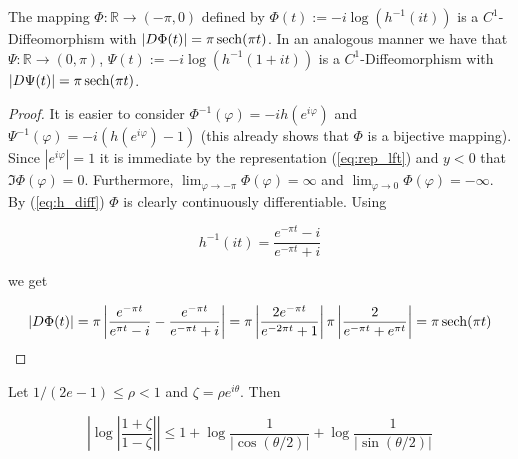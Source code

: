 \begin{lemma}
	The mapping $\Phi: \mathbb{R} \rightarrow (-\pi,0)$ defined by $\Phi(t) := -i\log\left( h^{-1}(it) \right)$ is a $C^1$-Diffeomorphism with $\vert D\Phi(t)\vert = \pi \operatorname{sech}(\pi t)$. In an analogous manner we have that $\Psi: \mathbb{R} \rightarrow (0,\pi)$, $\Psi(t) := -i\log\left( h^{-1}(1 + it) \right)$ is a $C^1$-Diffeomorphism with $\vert D\Psi(t)\vert = \pi \operatorname{sech}(\pi t)$.
	\label{lem:change_of_variables}
\end{lemma}

\begin{proof}
	It is easier to consider $\Phi^{-1}(\varphi) = -i h(e^{i\varphi})$ and $\Psi^{-1}(\varphi) = -i\left( h(e^{i\varphi}) - 1 \right)$ (this already shows that $\Phi$ is a bijective mapping). Since $\left| e^{i\varphi}\right| = 1$ it is immediate by the representation (\ref{eq:rep_lft}) and $y < 0$ that $\Im \Phi(\varphi) = 0$. Furthermore, $\lim_{\varphi \rightarrow -\pi} \Phi(\varphi) = \infty$ and $\lim_{\varphi \rightarrow 0} \Phi(\varphi) = -\infty$. By (\ref{eq:h_diff}) $\Phi$ is clearly continuously differentiable. Using
	
	\begin{equation*}
		h^{-1}(it) = \frac{e^{-\pi t} - i}{e^{-\pi t} + i}
	\end{equation*}
	
	we get

	\begin{gather*}
		\left| D\Phi(t)\right| = \pi\left| \frac{e^{-\pi t}}{e^{\pi t} - i} - \frac{e^{-\pi t}}{e^{-\pi t} + i}\right| = \pi\left| \frac{2e^{-\pi t}}{e^{-2\pi t} + 1}\right| \pi \left| \frac{2}{e^{-\pi t} + e^{\pi t}}\right|= \pi \operatorname{sech}(\pi t)
	\end{gather*}
\end{proof}

\begin{lemma}
	Let $1/(2e - 1) \leqslant \rho < 1$ and $\zeta = \rho e^{i\theta}$. Then

	\begin{equation*}
		\left| \log \left| \frac{1 + \zeta}{1 - \zeta} \right| \right| \leqslant 1 + \log \frac{1}{\left| \cos(\theta/2) \right|} + \log \frac{1}{\left| \sin(\theta/2) \right|}
	\end{equation*}
	\label{lem:upper_bound}
\end{lemma}

